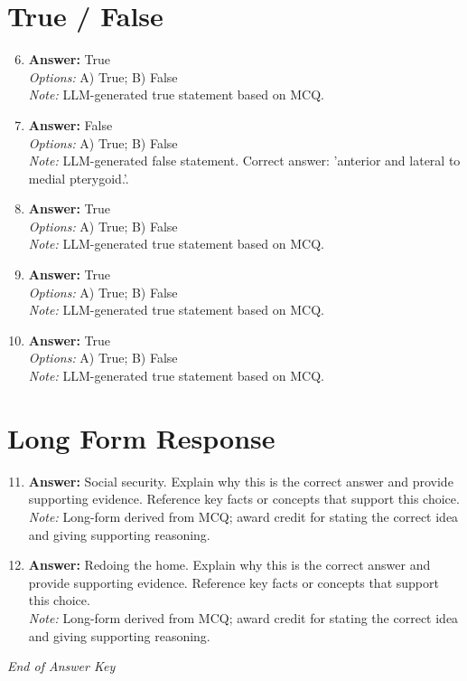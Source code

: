 \documentclass[12pt]{article}
\begin{document}
\section*{True / False}
\begin{enumerate}[label=\arabic*.]
\setcounter{enumi}{5}
\item \textbf{Answer:} True
\\ \textit{Options:} A) True; B) False
\\ \textit{Note:} LLM-generated true statement based on MCQ.
\item \textbf{Answer:} False
\\ \textit{Options:} A) True; B) False
\\ \textit{Note:} LLM-generated false statement. Correct answer: 'anterior and lateral to medial pterygoid.'.
\item \textbf{Answer:} True
\\ \textit{Options:} A) True; B) False
\\ \textit{Note:} LLM-generated true statement based on MCQ.
\item \textbf{Answer:} True
\\ \textit{Options:} A) True; B) False
\\ \textit{Note:} LLM-generated true statement based on MCQ.
\item \textbf{Answer:} True
\\ \textit{Options:} A) True; B) False
\\ \textit{Note:} LLM-generated true statement based on MCQ.
\end{enumerate}

\section*{Long Form Response}
\begin{enumerate}[label=\arabic*.]
\setcounter{enumi}{10}
\item \textbf{Answer:} Social security. Explain why this is the correct answer and provide supporting evidence. Reference key facts or concepts that support this choice.
\\ \textit{Note:} Long-form derived from MCQ; award credit for stating the correct idea and giving supporting reasoning.
\item \textbf{Answer:} Redoing the home. Explain why this is the correct answer and provide supporting evidence. Reference key facts or concepts that support this choice.
\\ \textit{Note:} Long-form derived from MCQ; award credit for stating the correct idea and giving supporting reasoning.
\end{enumerate}

\vfill
\noindent\textit{End of Answer Key}
\end{document}

